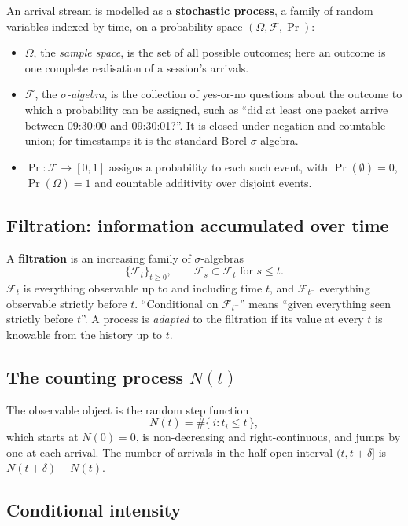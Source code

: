 An arrival stream is modelled as a \textbf{stochastic process}, a family of random
variables indexed by time, on a probability space $(\Omega, \mathcal{F}, \Pr)$:
\begin{itemize}
    \item $\Omega$, the \emph{sample space}, is the set of all possible outcomes; here an
outcome is one complete realisation of a session's arrivals.
    \item $\mathcal{F}$, the \emph{$\sigma$-algebra}, is the collection of yes-or-no
questions about the outcome to which a probability can be assigned, such as ``did at
least one packet arrive between 09:30:00 and 09:30:01?''. It is closed under negation and
countable union; for timestamps it is the standard Borel $\sigma$-algebra.
    \item $\Pr : \mathcal{F} \to [0, 1]$ assigns a probability to each such event, with
$\Pr(\emptyset) = 0$, $\Pr(\Omega) = 1$ and countable additivity over disjoint events.
\end{itemize}

\subsection{Filtration: information accumulated over time}
\label{app:pp-filtration}

A \textbf{filtration} is an increasing family of $\sigma$-algebras
$$\{\mathcal{F}_t\}_{t \geq 0}, \qquad \mathcal{F}_s \subset \mathcal{F}_t \text{ for } s \leq t.$$
$\mathcal{F}_t$ is everything observable up to and including time $t$, and
$\mathcal{F}_{t^-}$ everything observable strictly before $t$. ``Conditional on
$\mathcal{F}_{t^-}$'' means ``given everything seen strictly before $t$''. A process is
\emph{adapted} to the filtration if its value at every $t$ is knowable from the history
up to $t$.

\subsection{The counting process $N(t)$}
\label{app:pp-counting}

The observable object is the random step function
$$N(t) = \#\{\, i : t_i \leq t \,\},$$
which starts at $N(0) = 0$, is non-decreasing and right-continuous, and jumps by one at
each arrival. The number of arrivals in the half-open interval $(t, t + \delta]$ is
$N(t + \delta) - N(t)$.

\subsection{Conditional intensity}
\label{app:pp-intensity}

